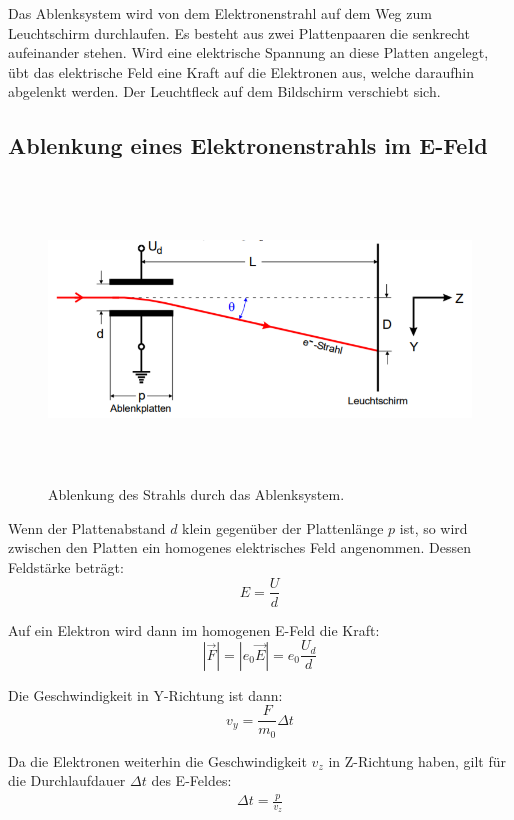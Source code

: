 Das Ablenksystem wird von dem Elektronenstrahl auf dem Weg zum Leuchtschirm durchlaufen. Es besteht aus
zwei Plattenpaaren die senkrecht aufeinander stehen. Wird eine elektrische Spannung an diese Platten angelegt, übt das
elektrische Feld eine Kraft auf die Elektronen aus, welche daraufhin abgelenkt werden.
Der Leuchtfleck auf dem Bildschirm verschiebt sich.

\subsection{Ablenkung eines Elektronenstrahls im E-Feld}

\begin{figure}[H]
  \centering
  \includegraphics[height=8cm]{ablenkungefeld.PNG}
  \caption{Ablenkung des Strahls durch das Ablenksystem. \cite{sample}}
  \label{fig:ablenkung}
\end{figure}

Wenn der Plattenabstand $d$ klein gegenüber der Plattenlänge $p$ ist, so wird zwischen den Platten
ein homogenes elektrisches Feld angenommen. Dessen Feldstärke beträgt:
\begin{equation}
  E = \frac{U}{d}
\end{equation}

Auf ein Elektron wird dann im homogenen E-Feld die Kraft:
\begin{equation}
  |\vec{F}| = |e_0 \vec{E}| = e_0 \frac{U_d}{d}
\end{equation}

Die Geschwindigkeit in Y-Richtung ist dann:
\begin{equation}
  v_y = \frac{F}{m_0} \Delta t
\end{equation}

Da die Elektronen weiterhin die Geschwindigkeit $v_z$ in Z-Richtung haben, gilt für
die Durchlaufdauer $\Delta t$ des E-Feldes:
\begin{align}
  \Delta t = \frac{p}{v_z}
\end{align}

